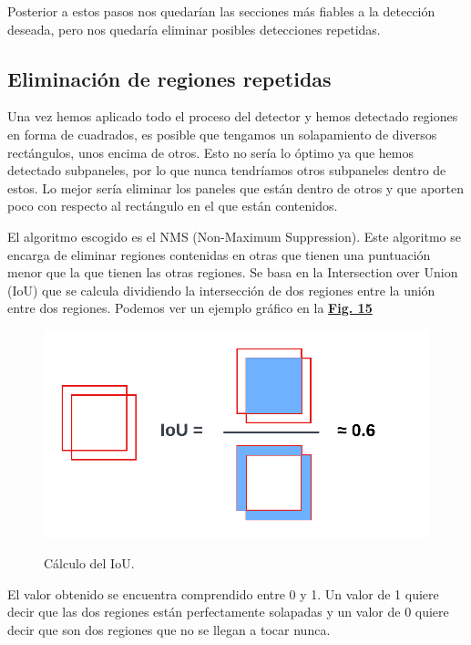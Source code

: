\documentclass[a4paper, 12pt]{article}
\begin{document}
Posterior a estos pasos nos quedarían las secciones más fiables a la detección deseada, pero nos quedaría eliminar posibles detecciones repetidas.
\subsection{Eliminación de regiones repetidas}
Una vez hemos aplicado todo el proceso del detector y hemos detectado regiones en forma de cuadrados, es posible que tengamos un solapamiento de diversos rectángulos, unos encima de otros. Esto no sería lo óptimo ya que hemos detectado subpaneles, por lo que nunca tendríamos otros subpaneles dentro de estos. Lo mejor sería eliminar los paneles que están dentro de otros y que aporten poco con respecto al rectángulo en el que están contenidos.

El algoritmo escogido es el NMS (Non-Maximum Suppression). Este algoritmo se encarga de eliminar regiones contenidas en otras que tienen una puntuación menor que la que tienen las otras regiones. Se basa en la Intersection over Union (IoU) que se calcula dividiendo la intersección de dos regiones entre la unión entre dos regiones. Podemos ver un ejemplo gráfico en la \textbf{\hyperref[fig:iou]{Fig. 15}}

\begin{figure}[h]
	\centering
	\caption{Cálculo del IoU.}\vspace{0.5cm}
	\includegraphics[width=0.5\linewidth]{img/iou.png}
	\label{fig:iou}
\end{figure}

El valor obtenido se encuentra comprendido entre 0 y 1. Un valor de 1 quiere decir que las dos regiones están perfectamente solapadas y un valor de 0 quiere decir que son dos regiones que no se llegan a tocar nunca. 
\end{document}
